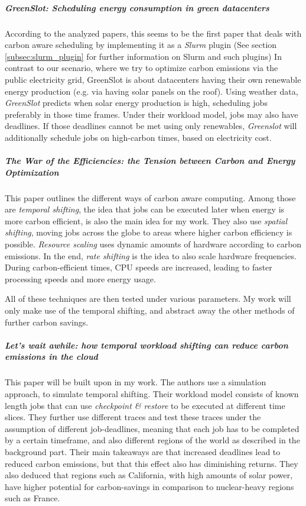 \subparagraph{GreenSlot: Scheduling energy consumption in green datacenters\cite{inigo_goiri_greenslot_2011}} According to the analyzed papers, this seems to be the first paper that deals with carbon aware scheduling by implementing it as a \emph{Slurm} plugin (See section \ref{subsec:slurm_plugin} for further information on Slurm and such plugins)
In contrast to our scenario, where we try to optimize carbon emissions via the public electricity grid, GreenSlot is about datacenters having their own renewable energy production (e.g. via having solar panels on the roof). 
Using weather data, \emph{GreenSlot} predicts when solar energy production is high, scheduling jobs preferably in those time frames.
Under their workload model, jobs may also have deadlines.
If those deadlines cannot be met using only renewables, \emph{Greenslot} will additionally schedule jobs on high-carbon times, based on electricity cost.

\subparagraph{The War of the Efficiencies: the Tension between Carbon and Energy Optimization}\cite{hanafy_war_2023} This paper outlines the different ways of carbon aware computing. 
Among those are \emph{temporal shifting}, the idea that jobs can be executed later when energy is more carbon efficient, is also the main idea for my work. 
They also use \emph{spatial shifting}, moving jobs across the globe to areas where higher carbon efficiency is possible. 
\emph{Resource scaling} uses dynamic amounts of hardware according to carbon emissions.
In the end, \emph{rate shifting} is the idea to also scale hardware frequencies. During carbon-efficient times, CPU speeds are increased, leading to faster processing speeds and more energy usage.

All of these techniques are then tested under various parameters. My work will only make use of the temporal shifting, and abstract away the other methods of further carbon savings.

\subparagraph{Let's wait awhile: how temporal workload shifting can reduce carbon emissions in the cloud} This paper will be built upon in my work.
The authors \cite{wiesner_lets_2021} use a simulation approach, to simulate temporal shifting. Their workload model consists of known length jobs that can use \emph{checkpoint \& restore} to be executed at different time slices. 
They further use different traces and test these traces under the assumption of different job-deadlines, meaning that each job has to be completed by a certain timeframe, and also different regions of the world as described in the background part. 
Their main takeaways are that increased deadlines lead to reduced carbon emissions, but that this effect also has diminishing returns. 
They also deduced that regions such as California, with high amounts of solar power, have higher potential for carbon-savings in comparison to nuclear-heavy regions such as France.